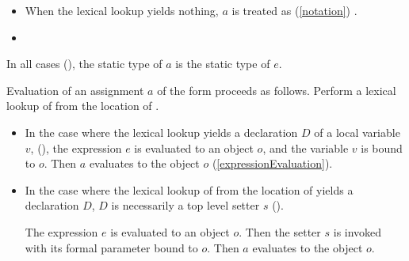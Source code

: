 \documentclass[makeidx]{article}
\begin{document}
{\begin{itemize}
  If $D$ is the declaration of a static setter in class or mixin $C$
  then $a$ is treated as
  (\ref{notation})
  the assignment .


  Otherwise, a compile-time error occurs,
  unless the static type of $e$ is assignable to the parameter type of $D$.
\item
  When the lexical lookup yields nothing,
  $a$ is treated as
  (\ref{notation})
  .

\item
\end{itemize}

\LMHash{}%
In all cases
(),
the static type of $a$ is the static type of $e$.

\LMHash{}%
Evaluation of an assignment $a$ of the form 
proceeds as follows.
Perform a lexical lookup of \code{\id=} from the location of \id.

\begin{itemize}
\item
  In the case where the lexical lookup yields
  a declaration $D$ of a local variable $v$,
  (),
  the expression $e$ is evaluated to an object $o$,
  and the variable $v$ is bound to $o$.
  Then $a$ evaluates to the object $o$
  (\ref{expressionEvaluation}).
\item
  In the case where the lexical lookup of \code{\id=}
  from the location of \id{}
  yields a declaration $D$,
  $D$ is necessarily a top level setter $s$
  ().

  The expression $e$ is evaluated to an object $o$.
  Then the setter $s$ is invoked
  with its formal parameter bound to $o$.
  Then $a$ evaluates to the object $o$.


\end{itemize}}
\end{document}
